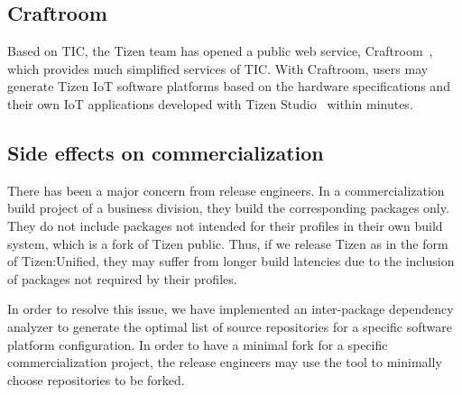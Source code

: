 \subsection{Craftroom}\label{SS_craftroom}

Based on TIC, the Tizen team has opened a public web service, Craftroom~\cite{5CraftroomURL}, which provides much simplified services of TIC.
With Craftroom, users may generate Tizen IoT software platforms based on the hardware specifications and their own IoT applications developed with Tizen Studio~\cite{23tizenstudio2018} within minutes.

\subsection{Side effects on commercialization}\label{SS_sideeffect_TC}

There has been a major concern from release engineers.
In a commercialization build project of a business division, they build the corresponding packages only.
They do not include packages not intended for their profiles in their own build system, which is a fork of Tizen public.
Thus, if we release Tizen as in the form of Tizen:Unified, they may suffer from longer build latencies due to the inclusion of packages not required by their profiles.


In order to resolve this issue, we have implemented an inter-package dependency analyzer to generate the optimal list of source repositories for a specific software platform configuration.
In order to have a minimal fork for a specific commercialization project, the release engineers may use the tool to minimally choose repositories to be forked.

